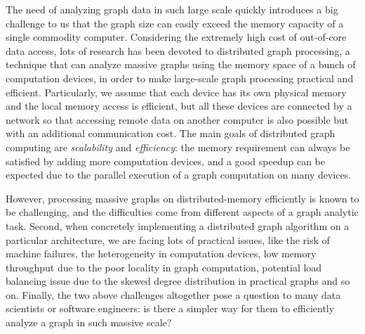 \documentclass{sokendai_thesis} %
\begin{document}
The need of analyzing graph data in such large scale quickly introduces a big challenge to us that the graph size can easily exceed the memory capacity of a single commodity computer.
Considering the extremely high cost of out-of-core data access, lots of research has been devoted to distributed graph processing, a technique that can analyze massive graphs using the memory space of a bunch of computation devices, in order to make large-scale graph processing practical and efficient.
Particularly, we assume that each device has its own physical memory and the local memory access is efficient, but all these devices are connected by a network so that accessing remote data on another computer is also possible but with an additional communication cost.
The main goals of distributed graph computing are \emph{scalability} and \emph{efficiency}: the memory requirement can always be satisfied by adding more computation devices, and a good speedup can be expected due to the parallel execution of a graph computation on many devices.


However, processing massive graphs on distributed-memory efficiently is known to be challenging, and the difficulties come from different aspects of a graph analytic task.
Second, when concretely implementing a distributed graph algorithm on a particular architecture, we are facing lots of practical issues, like the risk of machine failures, the heterogeneity in computation devices, low memory throughput due to the poor locality in graph computation, potential load balancing issue due to the skewed degree distribution in practical graphs and so on.
Finally, the two above challenges altogether pose a question to many data scientists or software engineers: is there a simpler way for them to efficiently analyze a graph in such massive scale?
\end{document}
